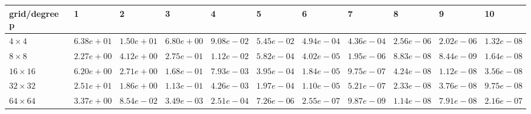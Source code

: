 \begin{tabular}{lllllllllll}
\hline
 grid/degree p   & 1          & 2          & 3          & 4          & 5          & 6          & 7          & 8          & 9          & 10         \\
\hline
 $4 \times 4$    & $6.38e+01$ & $1.50e+01$ & $6.80e+00$ & $9.08e-02$ & $5.45e-02$ & $4.94e-04$ & $4.36e-04$ & $2.56e-06$ & $2.02e-06$ & $1.32e-08$ \\
 $8 \times 8$    & $2.27e+00$ & $4.12e+00$ & $2.75e-01$ & $1.12e-02$ & $5.82e-04$ & $4.02e-05$ & $1.95e-06$ & $8.83e-08$ & $8.44e-09$ & $1.64e-08$ \\
 $16 \times 16$  & $6.20e+00$ & $2.71e+00$ & $1.68e-01$ & $7.93e-03$ & $3.95e-04$ & $1.84e-05$ & $9.75e-07$ & $4.24e-08$ & $1.12e-08$ & $3.56e-08$ \\
 $32 \times 32$  & $2.51e+01$ & $1.86e+00$ & $1.13e-01$ & $4.26e-03$ & $1.97e-04$ & $1.10e-05$ & $5.21e-07$ & $2.33e-08$ & $3.76e-08$ & $9.75e-08$ \\
 $64 \times 64$  & $3.37e+00$ & $8.54e-02$ & $3.49e-03$ & $2.51e-04$ & $7.26e-06$ & $2.55e-07$ & $9.87e-09$ & $1.14e-08$ & $7.91e-08$ & $2.16e-07$ \\
\hline
\end{tabular}